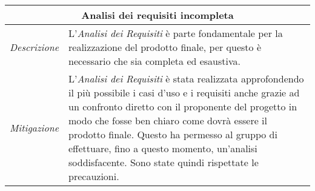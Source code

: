 \begin{table}[H]
    \centering
    \begin{tabular}{|p{2cm}|p{10cm}|}
    \hline
    \multicolumn{2}{|c|}{\textbf{Analisi dei requisiti incompleta}} \\ \hline
    \multicolumn{1}{|l|}{\textit{Descrizione}} & L'\textit{Analisi dei Requisiti} è parte fondamentale per la realizzazione del prodotto finale, per questo è necessario che sia completa ed esaustiva. \\ \hline
    \multicolumn{1}{|l|}{\textit{Mitigazione}} & L'\textit{Analisi dei Requisiti} è stata realizzata approfondendo il più possibile i casi d'uso e i requisiti anche grazie ad un confronto diretto con il proponente del progetto in modo che fosse ben chiaro come dovrà essere il prodotto finale. Questo ha permesso al gruppo di effettuare, fino a questo momento, un'analisi soddisfacente. Sono state quindi rispettate le precauzioni. \\ \hline
    \end{tabular}
\end{table}
